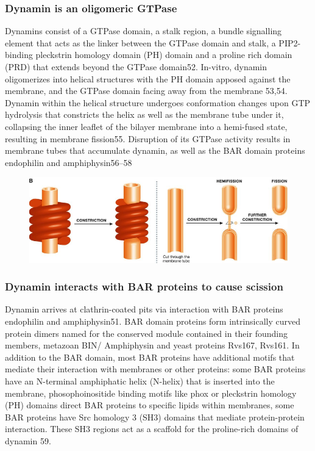 		 
		\subsubsection{Dynamin is an oligomeric GTPase}
		Dynamins consist of a GTPase domain, a stalk region, a bundle signalling element that acts as the linker between the GTPase domain and stalk, a PIP2-binding pleckstrin homology domain (PH) domain and a proline rich domain (PRD) that extends beyond the GTPase domain52. In-vitro, dynamin oligomerizes into helical structures with the PH domain apposed against the membrane, and the GTPase domain facing away from the membrane 53,54. Dynamin within the helical structure undergoes conformation changes upon GTP hydrolysis that constricts the helix as well as the membrane tube under it, collapsing the inner leaflet of the bilayer membrane into a hemi-fused state, resulting in membrane fission55. Disruption of its GTPase activity results in membrane tubes that accumulate dynamin, as well as the BAR domain proteins endophilin and amphiphysin56–58
		
		\begin{figure}[H]
			\centering
			\includegraphics[scale=0.5]{figures/intro/dynamin_2}
		\end{figure}

		\subsubsection{Dynamin interacts with BAR proteins to cause scission}
		Dynamin arrives at clathrin-coated pits via interaction with BAR proteins endophilin and amphiphysin51. BAR domain proteins form intrinsically curved protein dimers named for the conserved module contained in their founding members, metazoan BIN/ Amphiphysin and yeast proteins Rvs167, Rvs161. In addition to the BAR domain, most BAR proteins have additional motifs that mediate their interaction with membranes or other proteins: some BAR proteins have an N-terminal amphiphatic helix (N-helix) that is inserted into the membrane, phosophoinositide binding motifs like phox or pleckstrin homology (PH) domains direct BAR proteins to specific lipids within membranes, some BAR proteins have Src homology 3 (SH3) domains that mediate protein-protein interaction. These SH3 regions act as a scaffold for the proline-rich domains of dynamin 59. 


